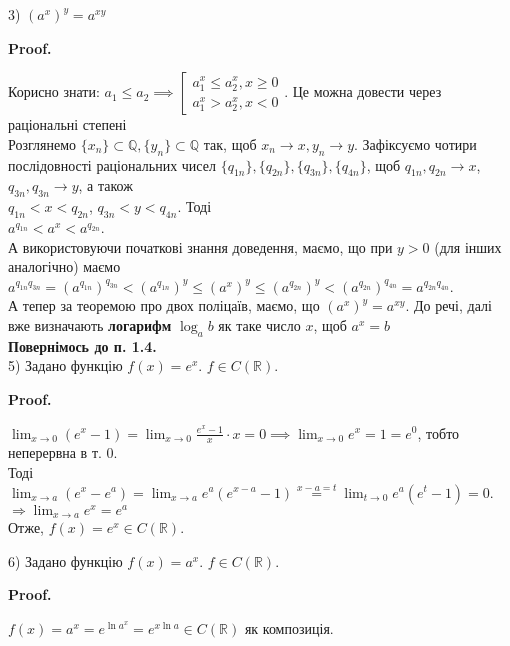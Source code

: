 \documentclass[a4paper, 14pt]{article}
\makeatletter
\def\huge{\displaystyle}
\def\qed{$\blacksquare$}
\theoremstyle{theoremdd}
\theoremstyle{theoremdd}
\theoremstyle{theoremdd}
\theoremstyle{theoremdd}
\theoremstyle{theoremdd}
\theoremstyle{theoremdd}
\theoremstyle{theoremdd}
\theoremstyle{theoremdd}
\renewenvironment{proof}[1][Proof.\\]{\par
\pushQED{\hfill \qed}%
\normalfont \topsep6\p@\@plus6\p@\relax
\trivlist
\item\relax
{\bfseries
#1\@addpunct{.}}\hspace\labelsep\ignorespaces
}{%
\popQED\endtrivlist\@endpefalse
}
\makeatother
\begin{document}
3) $(a^x)^y = a^{xy}$
\begin{proof}
Корисно знати: $a_1 \leq a_2 \implies \left[ \begin{gathered} a_1^x \leq a_2^x, x \geq 0 \\ a_1^x > a_2^x, x < 0 \end{gathered} \right.$. Це можна довести через раціональні степені\\
Розглянемо $\{x_n\} \subset \mathbb{Q}, \{y_n\} \subset \mathbb{Q}$ так, щоб $x_n \to x, y_n \to y$. Зафіксуємо чотири послідовності раціональних чисел $\{q_{1n}\},\{q_{2n}\},\{q_{3n}\},\{q_{4n}\}$, щоб $q_{1n},q_{2n} \to x$, $q_{3n},q_{3n} \to y$, а також \\
$q_{1n} < x < q_{2n}$, $q_{3n} < y < q_{4n}$. Тоді\\
$a^{q_{1n}} < a^x < a^{q_{2n}}$.\\
А використовуючи початкові знання доведення, маємо, що при $y > 0$ (для інших аналогічно) маємо\\
$a^{q_{1n} q_{3n}} = (a^{q_{1n}})^{q_{3n}} < (a^{q_{1n}})^y \leq (a^x)^y \leq (a^{q_{2n}})^y < (a^{q_{2n}})^{q_{4n}} = a^{q_{2n} q_{4n}}$.\\
А тепер за теоремою про двох поліцаїв, маємо, що $(a^x)^y = a^{xy}$.
\end{proof}
До речі, далі вже визначають \textbf{логарифм} $\huge\log_a b$ як таке число $x$, щоб $a^x = b$
\vspace{1cm} \\
\textbf{Повернімось до п. 1.4.} \\
5) Задано функцію $f(x) = e^x$. $f \in C(\mathbb{R})$.
\begin{proof}
$\huge \lim_{x \to 0} (e^x - 1) = \huge \lim_{x \to 0} \frac{e^x-1}{x}\cdot x = 0 \implies \huge \lim_{x \to 0} e^x = 1 = e^0$, тобто неперервна в т. $0$.\\
Тоді
$\huge \lim_{x \to a} (e^x - e^a) = \lim_{x \to a} e^a(e^{x-a}-1) \overset{x-a=t}{=} \lim_{t \to 0} e^a(e^t-1) = 0$.\\
$\Rightarrow \huge \lim_{x \to a} e^x = e^a$\\
Отже, $f(x) = e^x \in C(\mathbb{R})$.
\end{proof}

6) Задано функцію $f(x) = a^x$. $f \in C(\mathbb{R})$.
\begin{proof}
$f(x) = a^x = e^{\ln a^x} = e^{x \ln a} \in C(\mathbb{R})$ як композиція.
\end{proof}
\end{document}
